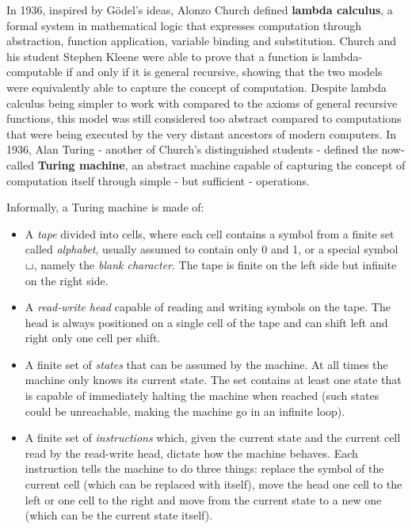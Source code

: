 In 1936, inspired by Gödel's ideas, Alonzo Church defined \textbf{lambda calculus}, a formal system in mathematical logic that expresses computation through abstraction, function application, variable binding and substitution. Church \cite{church} and his student Stephen Kleene \cite{kleene} were able to prove that a function is lambda-computable if and only if it is general recursive, showing that the two models were equivalently able to capture the concept of computation. Despite lambda calculus being simpler to work with compared to the axioms of general recursive functions, this model was still considered too abstract compared to  computations that were being executed by the very distant ancestors of modern computers. In 1936, Alan Turing - another of Church's distinguished students - defined the now-called \textbf{Turing machine}, an abstract machine capable of capturing the concept of computation itself through simple - but sufficient - operations.

Informally, a Turing machine is made of:
\begin{itemize}
    \item A \textit{tape} divided into cells, where each cell contains a symbol from a finite set called \textit{alphabet}, usually assumed to contain only 0 and 1, or a special symbol $\blankchar$, namely the \textit{blank character}. The tape is finite on the left side but infinite on the right side. 
    \item A \textit{read-write head} capable of reading and writing symbols on the tape. The head is always positioned on a single cell of the tape and can shift left and right only one cell per shift.
    \item A finite set of \textit{states} that can be assumed by the machine. At all times the machine only knows its current state. The set contains at least one state that is capable of immediately halting the machine when reached (such states could be unreachable, making the machine go in an infinite loop).
    \item A finite set of \textit{instructions} which, given the current state and the current cell read by the read-write head, dictate how the machine behaves. Each instruction tells the machine to do three things: replace the symbol of the current cell (which can be replaced with itself), move the head one cell to the left or one cell to the right and move from the current state to a new one (which can be the current state itself).
\end{itemize}

